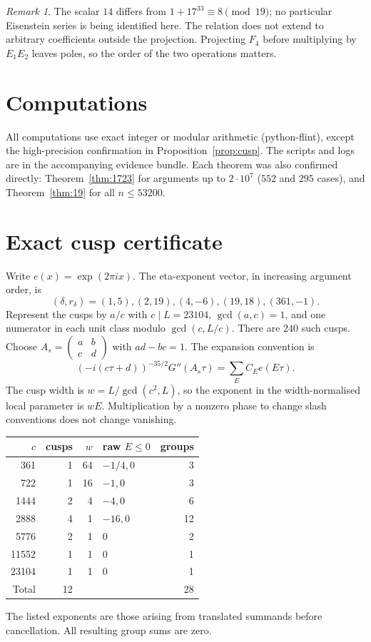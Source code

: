 \documentclass[11pt]{article}
\theoremstyle{remark}\newtheorem{remark}[theorem]{Remark}
\begin{document}
\begin{remark}
The scalar $14$ differs from $1+17^{33}\equiv8\pmod{19}$; no particular Eisenstein series is being identified here. The relation does not extend to arbitrary coefficients outside the projection. Projecting $F_4$ before multiplying by $E_1E_2$ leaves poles, so the order of the two operations matters.
\end{remark}

\section{Computations}
All computations use exact integer or modular arithmetic (python-flint), except the high-precision confirmation in Proposition~\ref{prop:cusp}. The scripts and logs are in the accompanying evidence bundle. Each theorem was also confirmed directly: Theorem~\ref{thm:1723} for arguments up to $2\cdot10^7$ ($552$ and $295$ cases), and Theorem~\ref{thm:19} for all $n\le53200$.

\appendix
\section{Exact cusp certificate}\label{app:cusp}
Write $e(x)=\exp(2\pi ix)$. The eta-exponent vector, in increasing argument order, is
\[(\delta,r_\delta)=(1,5),(2,19),(4,-6),(19,18),(361,-1).\]
Represent the cusps by $a/c$ with $c\mid L=23104$, $\gcd(a,c)=1$, and one numerator in each unit class modulo $\gcd(c,L/c)$. There are $240$ such cusps. Choose $A_s=\left(\begin{smallmatrix}a&b\\c&d\end{smallmatrix}\right)$ with $ad-bc=1$. The expansion convention is
\[(-i(c\tau+d))^{-35/2}G''(A_s\tau)=\sum_E C_E e(E\tau).
\]
The cusp width is $w=L/\gcd(c^2,L)$, so the exponent in the width-normalised local parameter is $wE$. Multiplication by a nonzero phase to change slash conventions does not change vanishing.

\begin{center}\small
\begin{tabular}{r r r l r}
$c$&cusps&$w$&raw $E\le0$&groups\\\hline
361&1&64&$-1/4,0$&3\\
722&1&16&$-1,0$&3\\
1444&2&4&$-4,0$&6\\
2888&4&1&$-16,0$&12\\
5776&2&1&$0$&2\\
11552&1&1&$0$&1\\
23104&1&1&$0$&1\\\hline
Total&12&&&28
\end{tabular}
\end{center}
The listed exponents are those arising from translated summands before cancellation. All resulting group sums are zero.
\end{document}
